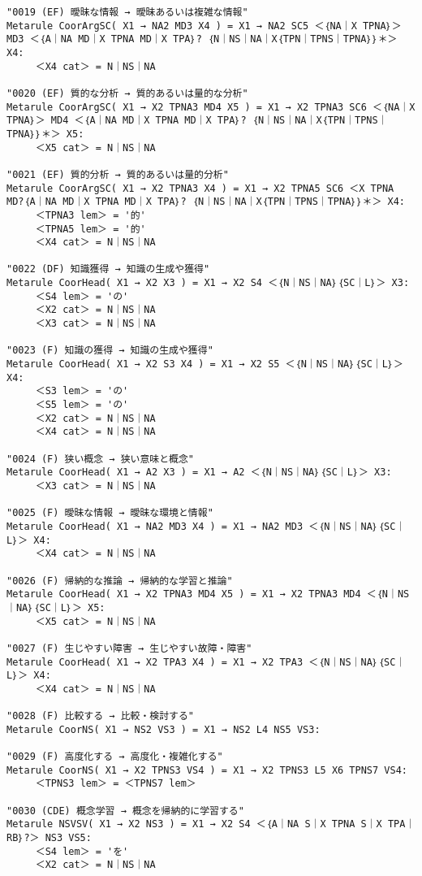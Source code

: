 {\begin{verbatim}
"0019 (EF) 曖昧な情報 → 曖昧あるいは複雑な情報"
Metarule CoorArgSC( X1 → NA2 MD3 X4 ) = X1 → NA2 SC5 ＜｛NA｜X TPNA｝＞ MD3 ＜｛A｜NA MD｜X TPNA MD｜X TPA｝? ｛N｜NS｜NA｜X｛TPN｜TPNS｜TPNA｝｝＊＞ X4:
     ＜X4 cat＞ = N｜NS｜NA

"0020 (EF) 質的な分析 → 質的あるいは量的な分析"
Metarule CoorArgSC( X1 → X2 TPNA3 MD4 X5 ) = X1 → X2 TPNA3 SC6 ＜｛NA｜X TPNA｝＞ MD4 ＜｛A｜NA MD｜X TPNA MD｜X TPA｝? ｛N｜NS｜NA｜X｛TPN｜TPNS｜TPNA｝｝＊＞ X5:
     ＜X5 cat＞ = N｜NS｜NA

"0021 (EF) 質的分析 → 質的あるいは量的分析"
Metarule CoorArgSC( X1 → X2 TPNA3 X4 ) = X1 → X2 TPNA5 SC6 ＜X TPNA MD?｛A｜NA MD｜X TPNA MD｜X TPA｝? ｛N｜NS｜NA｜X｛TPN｜TPNS｜TPNA｝｝＊＞ X4:
     ＜TPNA3 lem＞ = '的'
     ＜TPNA5 lem＞ = '的'
     ＜X4 cat＞ = N｜NS｜NA

"0022 (DF) 知識獲得 → 知識の生成や獲得"
Metarule CoorHead( X1 → X2 X3 ) = X1 → X2 S4 ＜｛N｜NS｜NA｝｛SC｜L｝＞ X3:
     ＜S4 lem＞ = 'の'
     ＜X2 cat＞ = N｜NS｜NA
     ＜X3 cat＞ = N｜NS｜NA

"0023 (F) 知識の獲得 → 知識の生成や獲得"
Metarule CoorHead( X1 → X2 S3 X4 ) = X1 → X2 S5 ＜｛N｜NS｜NA｝｛SC｜L｝＞ X4:
     ＜S3 lem＞ = 'の'
     ＜S5 lem＞ = 'の'
     ＜X2 cat＞ = N｜NS｜NA
     ＜X4 cat＞ = N｜NS｜NA

"0024 (F) 狭い概念 → 狭い意味と概念"
Metarule CoorHead( X1 → A2 X3 ) = X1 → A2 ＜｛N｜NS｜NA｝｛SC｜L｝＞ X3:
     ＜X3 cat＞ = N｜NS｜NA

"0025 (F) 曖昧な情報 → 曖昧な環境と情報"
Metarule CoorHead( X1 → NA2 MD3 X4 ) = X1 → NA2 MD3 ＜｛N｜NS｜NA｝｛SC｜L｝＞ X4:
     ＜X4 cat＞ = N｜NS｜NA

"0026 (F) 帰納的な推論 → 帰納的な学習と推論"
Metarule CoorHead( X1 → X2 TPNA3 MD4 X5 ) = X1 → X2 TPNA3 MD4 ＜｛N｜NS｜NA｝｛SC｜L｝＞ X5:
     ＜X5 cat＞ = N｜NS｜NA

"0027 (F) 生じやすい障害 → 生じやすい故障・障害"
Metarule CoorHead( X1 → X2 TPA3 X4 ) = X1 → X2 TPA3 ＜｛N｜NS｜NA｝｛SC｜L｝＞ X4:
     ＜X4 cat＞ = N｜NS｜NA

"0028 (F) 比較する → 比較・検討する"
Metarule CoorNS( X1 → NS2 VS3 ) = X1 → NS2 L4 NS5 VS3:

"0029 (F) 高度化する → 高度化・複雑化する"
Metarule CoorNS( X1 → X2 TPNS3 VS4 ) = X1 → X2 TPNS3 L5 X6 TPNS7 VS4:
     ＜TPNS3 lem＞ = ＜TPNS7 lem＞

"0030 (CDE) 概念学習 → 概念を帰納的に学習する"
Metarule NSVSV( X1 → X2 NS3 ) = X1 → X2 S4 ＜｛A｜NA S｜X TPNA S｜X TPA｜RB｝?＞ NS3 VS5:
     ＜S4 lem＞ = 'を'
     ＜X2 cat＞ = N｜NS｜NA


\end{verbatim}}
